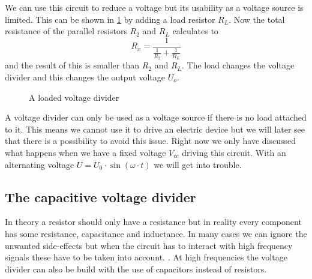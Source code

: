 We can use this circuit to reduce a voltage but its usability as a voltage source is limited. This can be shown in \cref{fig:loaded-voltage-divider} by adding a load resistor $R_L$. Now the total resistance of the parallel resistors $R_2$ and $R_L$ calculates to
\begin{equation*}
	R_x = \frac{1}{\frac{1}{R_2} + \frac{1}{R_L}}
\end{equation*}
and the result of this is smaller than $R_2$ and $R_L$. The load changes the voltage divider and this changes the output voltage $U_o$.


\begin{figure}[htb]
	\centering
	\caption{A loaded voltage divider}
	\label{fig:loaded-voltage-divider}
\end{figure}

A voltage divider can only be used as a voltage source if there is no load attached to it. This means we cannot use it to drive an electric device but we will later see that there is a possibility to avoid this issue. Right now we only have discussed what happens when we have a fixed voltage $V_{cc}$ driving this circuit. With an alternating voltage $U = U_0 \cdot \sin(\omega \cdot t)$ we will get into trouble.

\subsection{The capacitive voltage divider}

In theory a resistor should only have a resistance but in reality every component has some resistance, capacitance and inductance. In many cases we can ignore the unwanted side-effects but when the circuit has to interact with high frequency signals these have to be taken into account. . At high frequencies the voltage divider can also be build with the use of capacitors instead of resistors.
